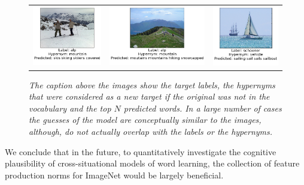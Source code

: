 \begin{figure}
\begin{tabular}{ccc}
\includegraphics[scale=0.23]{chapters/TAL/imagenet/ski} & \includegraphics[scale=0.23]{chapters/TAL/imagenet/mountain} & \includegraphics[scale=0.23]{chapters/TAL/imagenet/sail}
\end{tabular}
\caption{\textit{The caption above the images show the target labels, the
  hypernyms that were considered as a new target if the original was
  not in the vocabulary and the top $N$ predicted words. In a large
  number of cases the guesses of the model are conceptually similar to
  the images, although, do not actually overlap with the labels or the
  hypernyms.}}
\label{fig:pretty}
\end{figure}

We conclude that in the future, to quantitatively investigate the cognitive plausibility of cross-situational
models of word learning, the collection of feature production norms for ImageNet \citep{russakovsky2015imagenet} would
be largely beneficial.

